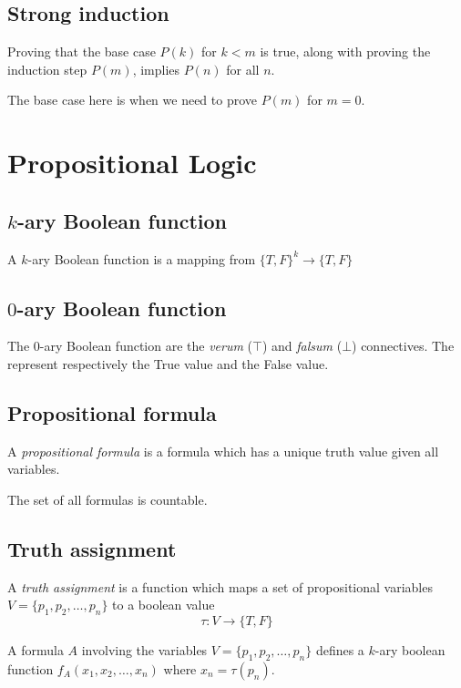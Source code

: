 \documentclass[a4paper]{article}
\begin{document}
\subsection{Strong induction}

Proving that the base case \(P(k)\) for \(k < m\) is true, along with
proving the induction step \(P(m)\), implies \(P(n)\)
for all \(n\).

The base case here is when we need to prove \(P(m)\) for \(m=0\).

\pagebreak

\section{Propositional Logic}

\subsection{\(k\)-ary Boolean function}

A \(k\)-ary Boolean function is a mapping from \({\{T, F\}}^k \to \{T,F\}\)

\subsection{\(0\)-ary Boolean function}

The \(0\)-ary Boolean function are the \textit{verum} (\(\top\)) and \textit{falsum} (\(\bot\)) connectives.
The represent respectively the True value and the False value.

\subsection{Propositional formula}

A \textit{propositional formula} is a formula which has a unique truth value given all variables.

The set of all formulas is countable.

\subsection{Truth assignment}

A \textit{truth assignment} is a function which maps a set of propositional
variables \(V=\{p_1, p_2, \ldots, p_n\}\) to a boolean value
\[
    \tau: V \to \{T,F\}
\]

A formula \(A\) involving the variables \(V=\{p_1, p_2, \ldots, p_n\}\)
defines a \(k\)-ary boolean function \(f_A(x_1, x_2, \ldots, x_n)\) where \(x_n = \tau(p_n)\).
\end{document}
